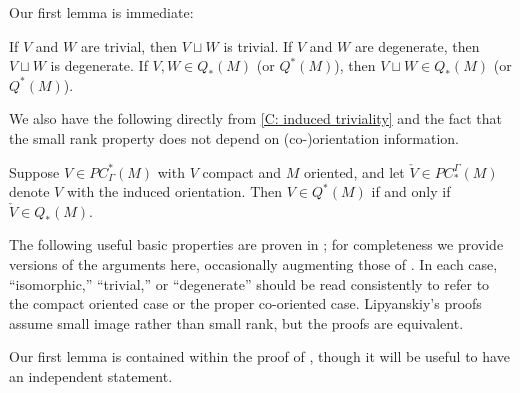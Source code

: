 Our first lemma is immediate:

\begin{lemma}\label{L: sum of trivial/degenerate}
	If $V$ and $W$ are trivial, then $V \sqcup W$ is trivial.
	If $V$ and $W$ are degenerate, then $V \sqcup W$ is degenerate.
	If $V,W\in Q_*(M)$ (or $Q^*(M)$), then $V \sqcup W \in Q_*(M)$ (or $Q^*(M)$).
\end{lemma}

We also have the following directly from \cref{C: induced triviality} and the fact that the small rank property does not depend on (co-)orientation information.

\begin{lemma}\label{L: Q switch}
	Suppose $V \in PC^*_\Gamma(M)$ with $V$ compact and $M$ oriented, and let $\check V \in PC_*^\Gamma(M)$ denote $V$ with the induced orientation.
	Then $V \in Q^*(M)$ if and only if $\check V \in Q_*(M)$.
\end{lemma}

The following useful basic properties are proven in \cite{Lipy14}; for completeness we provide versions of the arguments here, occasionally augmenting those of \cite{Lipy14}.
In each case, ``isomorphic,'' ``trivial,'' or ``degenerate'' should be read consistently to refer to the compact oriented case or the proper co-oriented case.
Lipyanskiy's proofs assume small image rather than small rank, but the proofs are equivalent.

Our first lemma is contained within the proof of \cite[Lemma 10]{Lipy14}, though it will be useful to have an independent statement.

